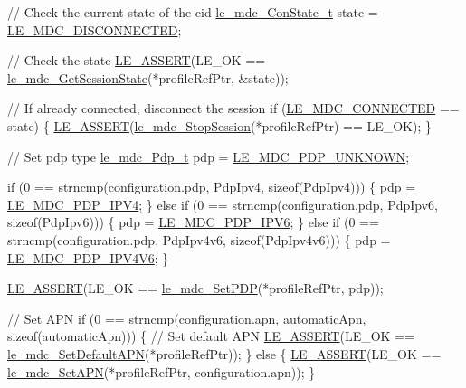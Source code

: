 \begin{DoxyCodeInclude}
{{{{{{{    \textcolor{comment}{// Check the current state of the cid}
    \hyperlink{le__mdc__interface_8h_a0727e543d0394422963c8d6297947333}{le\_mdc\_ConState\_t} state = \hyperlink{le__mdc__interface_8h_a0727e543d0394422963c8d6297947333a6d11ee963528c79d73a269eb85202ba7}{LE\_MDC\_DISCONNECTED};

    \textcolor{comment}{// Check the state}
    \hyperlink{le__log_8h_ac0dbbef91dc0fed449d0092ff0557b39}{LE\_ASSERT}(LE\_OK == \hyperlink{le__mdc__interface_8h_add91c364e8b3e4e82a0ce64e480c016b}{le\_mdc\_GetSessionState}(*profileRefPtr, &state));

    \textcolor{comment}{// If already connected, disconnect the session}
    \textcolor{keywordflow}{if} (\hyperlink{le__mdc__interface_8h_a0727e543d0394422963c8d6297947333a0a8a2113935b881b76c59b94cf7223b8}{LE\_MDC\_CONNECTED} == state)
    \{
        \hyperlink{le__log_8h_ac0dbbef91dc0fed449d0092ff0557b39}{LE\_ASSERT}(\hyperlink{le__mdc__interface_8h_a53453f85065c3cace0922150b7e3d869}{le\_mdc\_StopSession}(*profileRefPtr) == LE\_OK);
    \}

    \textcolor{comment}{// Set pdp type}
    \hyperlink{le__mdc__interface_8h_a85721ec6046140c2f87c23f877dce247}{le\_mdc\_Pdp\_t} pdp = \hyperlink{le__mdc__interface_8h_a85721ec6046140c2f87c23f877dce247a590fd5c933c3751e42053f996d530987}{LE\_MDC\_PDP\_UNKNOWN};

    \textcolor{keywordflow}{if} (0 == strncmp(configuration.pdp, PdpIpv4, \textcolor{keyword}{sizeof}(PdpIpv4)))
    \{
        pdp = \hyperlink{le__mdc__interface_8h_a85721ec6046140c2f87c23f877dce247af550adf5bcecb680294f92f28496a830}{LE\_MDC\_PDP\_IPV4};
    \}
    \textcolor{keywordflow}{else} \textcolor{keywordflow}{if} (0 == strncmp(configuration.pdp, PdpIpv6, \textcolor{keyword}{sizeof}(PdpIpv6)))
    \{
        pdp = \hyperlink{le__mdc__interface_8h_a85721ec6046140c2f87c23f877dce247ac2d2a34bad2d18be1ea8facef0effad0}{LE\_MDC\_PDP\_IPV6};
    \}
    \textcolor{keywordflow}{else} \textcolor{keywordflow}{if} (0 == strncmp(configuration.pdp, PdpIpv4v6, \textcolor{keyword}{sizeof}(PdpIpv4v6)))
    \{
        pdp = \hyperlink{le__mdc__interface_8h_a85721ec6046140c2f87c23f877dce247a4427db8ba7a89ebf66c7b62eacfc8275}{LE\_MDC\_PDP\_IPV4V6};
    \}

    \hyperlink{le__log_8h_ac0dbbef91dc0fed449d0092ff0557b39}{LE\_ASSERT}(LE\_OK == \hyperlink{le__mdc__interface_8h_a73e66a7a63dc95d7f261fc2a26470386}{le\_mdc\_SetPDP}(*profileRefPtr, pdp));

    \textcolor{comment}{// Set APN}
    \textcolor{keywordflow}{if} (0 == strncmp(configuration.apn, automaticApn, \textcolor{keyword}{sizeof}(automaticApn)))
    \{
        \textcolor{comment}{// Set default APN}
        \hyperlink{le__log_8h_ac0dbbef91dc0fed449d0092ff0557b39}{LE\_ASSERT}(LE\_OK == \hyperlink{le__mdc__interface_8h_ad44bd756fd5cbfd43a5b348054786a4d}{le\_mdc\_SetDefaultAPN}(*profileRefPtr));
    \}
    \textcolor{keywordflow}{else}
    \{
        \hyperlink{le__log_8h_ac0dbbef91dc0fed449d0092ff0557b39}{LE\_ASSERT}(LE\_OK == \hyperlink{le__mdc__interface_8h_ae8ebd11b9cb9afb9b6b5745903f50156}{le\_mdc\_SetAPN}(*profileRefPtr, configuration.apn));
    \}

}}}}}}}
\end{DoxyCodeInclude}
